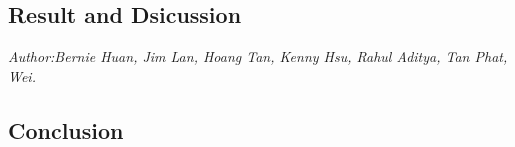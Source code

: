 


\subsection*{Result and Dsicussion}
\textit{\footnotesize Author:Bernie Huan, Jim Lan, Hoang Tan, Kenny Hsu, Rahul Aditya, Tan Phat, Wei.}\\




\subsection*{Conclusion}

